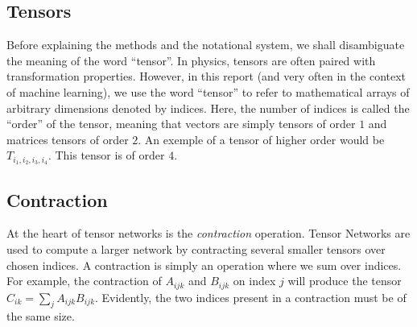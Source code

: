\documentclass{article}
\theoremstyle{definition}
\theoremstyle{definition}
\begin{document}
\subsection{Tensors}
Before explaining the methods and the notational system, we shall disambiguate the meaning of the word \enquote{tensor}. In physics, tensors are often paired with transformation properties. 
However, in this report (and very often in the context of machine learning), we use the word \enquote{tensor} to refer to mathematical arrays of arbitrary dimensions denoted by indices. Here, the number of indices is called the \enquote{order} of the tensor, meaning that vectors are simply tensors of order $1$ and matrices tensors of order $2$. An exemple of a tensor of higher order would be $T_{i_1,i_2,i_3,i_4}$. This tensor is of order $4$.

\subsection{Contraction}
At the heart of tensor networks is the {\it contraction} operation.
Tensor Networks are used to compute a larger network by contracting several
smaller tensors over chosen indices. A contraction is simply an operation 
where we sum over indices. For example, the contraction of $A_{ijk}$ and 
$B_{ijk}$ on index $j$ will produce the tensor $C_{ik} = \sum_{j} A_{ijk} B_{ijk}$.
Evidently, the two indices present in a contraction must be of the same size.
\end{document}
